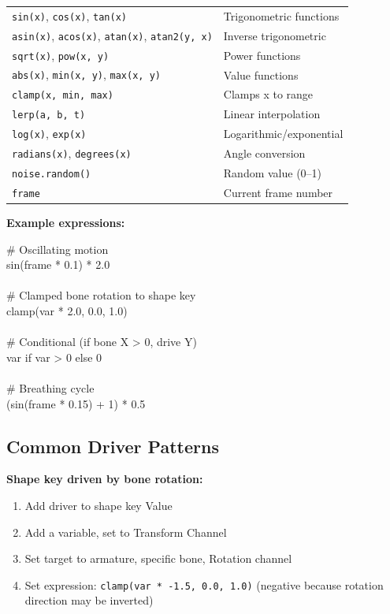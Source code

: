 \begin{center}
\begin{tabularx}{\textwidth}{L{5.5cm}X}
\toprule
{}
 &  \\
\midrule
\texttt{sin(x)}, \texttt{cos(x)}, \texttt{tan(x)} & Trigonometric functions \\
\texttt{asin(x)}, \texttt{acos(x)}, \texttt{atan(x)}, \texttt{atan2(y, x)} & Inverse trigonometric \\
\texttt{sqrt(x)}, \texttt{pow(x, y)} & Power functions \\
\texttt{abs(x)}, \texttt{min(x, y)}, \texttt{max(x, y)} & Value functions \\
\texttt{clamp(x, min, max)} & Clamps x to range \\
\texttt{lerp(a, b, t)} & Linear interpolation \\
\texttt{log(x)}, \texttt{exp(x)} & Logarithmic/exponential \\
\texttt{radians(x)}, \texttt{degrees(x)} & Angle conversion \\
\texttt{noise.random()} & Random value (0--1) \\
\texttt{frame} & Current frame number \\
\bottomrule
\end{tabularx}
\end{center}

\textbf{Example expressions:}

\begin{codebox}
\# Oscillating motion\\
sin(frame * 0.1) * 2.0\\
\\
\# Clamped bone rotation to shape key\\
clamp(var * 2.0, 0.0, 1.0)\\
\\
\# Conditional (if bone X > 0, drive Y)\\
var if var > 0 else 0\\
\\
\# Breathing cycle\\
(sin(frame * 0.15) + 1) * 0.5
\end{codebox}

\subsection{Common Driver Patterns}

\textbf{Shape key driven by bone rotation:}
\begin{enumerate}[leftmargin=2em]
  \item Add driver to shape key Value
  \item Add a variable, set to Transform Channel
  \item Set target to armature, specific bone, Rotation channel
  \item Set expression: \texttt{clamp(var * -1.5, 0.0, 1.0)} (negative because rotation direction may be inverted)
\end{enumerate}

